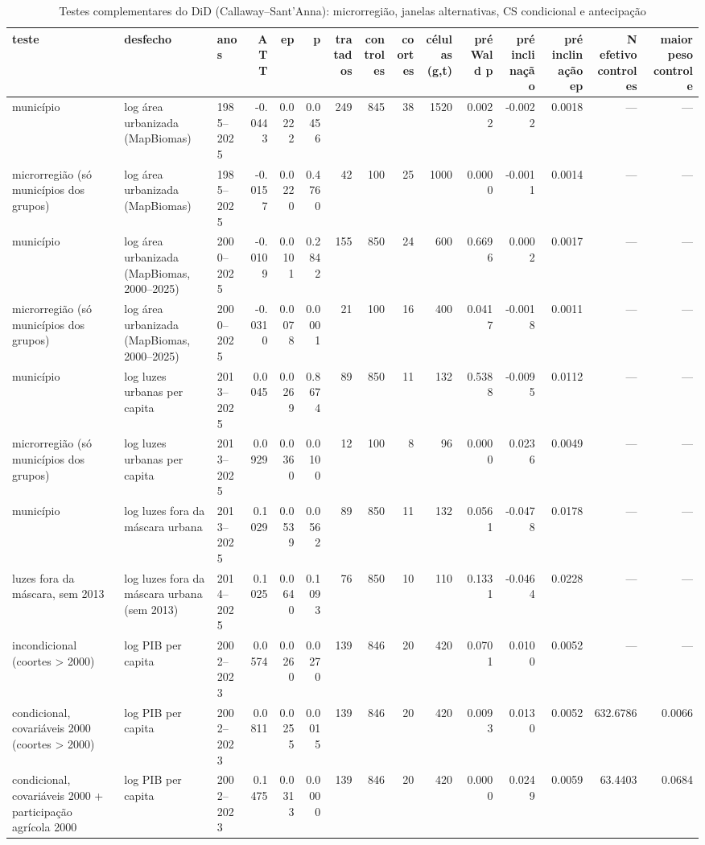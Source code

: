\begin{table}
\caption{Testes complementares do DiD (Callaway–Sant'Anna): microrregião, janelas alternativas, CS condicional e antecipação}
\label{tab:s08_complementos}
\begin{tabular}{lllrrrrrrrrrrrr}
\toprule
teste & desfecho & anos & ATT & ep & p & tratados & controles & coortes & células (g,t) & pré Wald p & pré inclinação & pré inclinação ep & N efetivo controles & maior peso controle \\
\midrule
município & log área urbanizada (MapBiomas) & 1985–2025 & -0.0443 & 0.0222 & 0.0456 & 249 & 845 & 38 & 1520 & 0.0022 & -0.0022 & 0.0018 & — & — \\
microrregião (só municípios dos grupos) & log área urbanizada (MapBiomas) & 1985–2025 & -0.0157 & 0.0220 & 0.4760 & 42 & 100 & 25 & 1000 & 0.0000 & -0.0011 & 0.0014 & — & — \\
município & log área urbanizada (MapBiomas, 2000–2025) & 2000–2025 & -0.0109 & 0.0101 & 0.2842 & 155 & 850 & 24 & 600 & 0.6696 & 0.0002 & 0.0017 & — & — \\
microrregião (só municípios dos grupos) & log área urbanizada (MapBiomas, 2000–2025) & 2000–2025 & -0.0310 & 0.0078 & 0.0001 & 21 & 100 & 16 & 400 & 0.0417 & -0.0018 & 0.0011 & — & — \\
município & log luzes urbanas per capita & 2013–2025 & 0.0045 & 0.0269 & 0.8674 & 89 & 850 & 11 & 132 & 0.5388 & -0.0095 & 0.0112 & — & — \\
microrregião (só municípios dos grupos) & log luzes urbanas per capita & 2013–2025 & 0.0929 & 0.0360 & 0.0100 & 12 & 100 & 8 & 96 & 0.0000 & 0.0236 & 0.0049 & — & — \\
município & log luzes fora da máscara urbana & 2013–2025 & 0.1029 & 0.0539 & 0.0562 & 89 & 850 & 11 & 132 & 0.0561 & -0.0478 & 0.0178 & — & — \\
luzes fora da máscara, sem 2013 & log luzes fora da máscara urbana (sem 2013) & 2014–2025 & 0.1025 & 0.0640 & 0.1093 & 76 & 850 & 10 & 110 & 0.1331 & -0.0464 & 0.0228 & — & — \\
incondicional (coortes > 2000) & log PIB per capita & 2002–2023 & 0.0574 & 0.0260 & 0.0270 & 139 & 846 & 20 & 420 & 0.0701 & 0.0100 & 0.0052 & — & — \\
condicional, covariáveis 2000 (coortes > 2000) & log PIB per capita & 2002–2023 & 0.0811 & 0.0255 & 0.0015 & 139 & 846 & 20 & 420 & 0.0093 & 0.0130 & 0.0052 & 632.6786 & 0.0066 \\
condicional, covariáveis 2000 + participação agrícola 2000 & log PIB per capita & 2002–2023 & 0.1475 & 0.0313 & 0.0000 & 139 & 846 & 20 & 420 & 0.0000 & 0.0249 & 0.0059 & 63.4403 & 0.0684 \\

\end{tabular}
\end{table}
